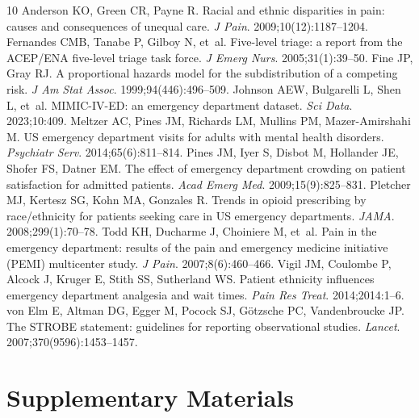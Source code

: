 \documentclass[11pt]{article}
\begin{document}
\begin{thebibliography}{10}
 Anderson KO, Green CR, Payne R. Racial and ethnic disparities in pain: causes and consequences of unequal care. \emph{J Pain}. 2009;10(12):1187--1204.
 Fernandes CMB, Tanabe P, Gilboy N, et~al. Five-level triage: a report from the ACEP/ENA five-level triage task force. \emph{J Emerg Nurs}. 2005;31(1):39--50.
 Fine JP, Gray RJ. A proportional hazards model for the subdistribution of a competing risk. \emph{J Am Stat Assoc}. 1999;94(446):496--509.
 Johnson AEW, Bulgarelli L, Shen L, et~al. MIMIC-IV-ED: an emergency department dataset. \emph{Sci Data}. 2023;10:409.
 Meltzer AC, Pines JM, Richards LM, Mullins PM, Mazer-Amirshahi M. US emergency department visits for adults with mental health disorders. \emph{Psychiatr Serv}. 2014;65(6):811--814.
 Pines JM, Iyer S, Disbot M, Hollander JE, Shofer FS, Datner EM. The effect of emergency department crowding on patient satisfaction for admitted patients. \emph{Acad Emerg Med}. 2009;15(9):825--831.
 Pletcher MJ, Kertesz SG, Kohn MA, Gonzales R. Trends in opioid prescribing by race/ethnicity for patients seeking care in US emergency departments. \emph{JAMA}. 2008;299(1):70--78.
 Todd KH, Ducharme J, Choiniere M, et~al. Pain in the emergency department: results of the pain and emergency medicine initiative (PEMI) multicenter study. \emph{J Pain}. 2007;8(6):460--466.
 Vigil JM, Coulombe P, Alcock J, Kruger E, Stith SS, Sutherland WS. Patient ethnicity influences emergency department analgesia and wait times. \emph{Pain Res Treat}. 2014;2014:1--6.
 von Elm E, Altman DG, Egger M, Pocock SJ, G\"otzsche PC, Vandenbroucke JP. The STROBE statement: guidelines for reporting observational studies. \emph{Lancet}. 2007;370(9596):1453--1457.
\end{thebibliography}


\clearpage
\appendix

\section*{Supplementary Materials}
\label{sec:supplement}
\setcounter{figure}{0}
\renewcommand{\thefigure}{S\arabic{figure}}
\setcounter{table}{0}
\renewcommand{\thetable}{S\arabic{table}}
\end{document}
